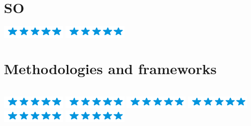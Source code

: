 \documentclass[american]{cv-class}
\begin{document}
\begin{aside}
	\section{SO}
	{\includegraphics[scale=0.40]{img/stars/5stars.png}}
	{\includegraphics[scale=0.40]{img/stars/5stars.png}}
	~
	\section{Methodologies and frameworks } \\
	{\includegraphics[scale=0.40]{img/stars/5stars.png}}
	{\includegraphics[scale=0.40]{img/stars/5stars.png}}
	{\includegraphics[scale=0.40]{img/stars/5stars.png}}
	{\includegraphics[scale=0.40]{img/stars/5stars.png}}
	{\includegraphics[scale=0.40]{img/stars/5stars.png}}
	{\includegraphics[scale=0.40]{img/stars/5stars.png}}
	    
	~
\end{aside}
\end{document}
